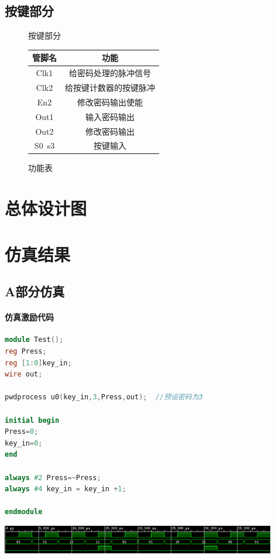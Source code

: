 \documentclass[a4paper,11pt]{ctexart}
\begin{document}
\subsection{按键部分}
\begin{figure}[htb]
  \begin{minipage}[b]{0.5\textwidth}
    \centering
    \caption{按键部分}
    \label{fig:by:table}
  \end{minipage}%
  \begin{minipage}[b]{0.5\textwidth}
    \centering
    \begin{tabular}{|c|c|} \hline
      管脚名 & 功能 \\ \hline\hline
      Clk1     &   给密码处理的脉冲信号\\
      Clk2     & 给按键计数器的按键脉冲 \\
      En2      & 修改密码输出使能 \\
      Out1     & 输入密码输出 \\
      Out2     & 修改密码输出 \\
      S0~s3    & 按键输入 \\ \hline
    \end{tabular}
    \caption{功能表}
    \label{table:by:fig}
  \end{minipage}
\end{figure}


\section{总体设计图}


\section{仿真结果}
\subsection{A部分仿真}
\paragraph{仿真激励代码}
\begin{lstlisting}[language={verilog}]
module Test();
reg Press;
reg [1:0]key_in;
wire out;

pwdprocess u0(key_in,3,Press,out);  //预设密码为3

initial begin
Press=0;
key_in=0;
end

always #2 Press=~Press;
always #4 key_in = key_in +1;

endmodule
\end{lstlisting}
\includegraphics[width=0.9\textwidth]{./images/sim1.eps}
\end{document}
